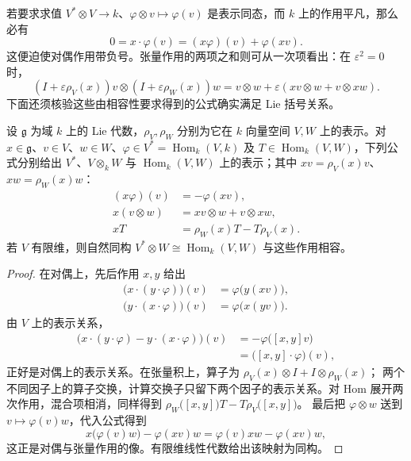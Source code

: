 若要求求值 \(V^*\otimes V\to k\)、\(\varphi\otimes v\mapsto\varphi(v)\) 是表示同态，而 \(k\) 上的作用平凡，那么必有
\[
	0=x\cdot\varphi(v)=(x\varphi)(v)+\varphi(xv).
\]
这便迫使对偶作用带负号。张量作用的两项之和则可从一次项看出：在 \(\varepsilon^2=0\) 时，
\[
	(I+\varepsilon\rho_V(x))v\otimes(I+\varepsilon\rho_W(x))w =v\otimes w+\varepsilon(xv\otimes w+v\otimes xw).
\]
下面还须核验这些由相容性要求得到的公式确实满足 Lie 括号关系。

\begin{proposition}\label{b5:prop:lie-dual-tensor-hom}
	设 \(\mathfrak g\) 为域 \(k\) 上的 Lie 代数，\(\rho_V,\rho_W\) 分别为它在 \(k\) 向量空间 \(V,W\) 上的表示。对 \(x\in\mathfrak g\)、\(v\in V\)、\(w\in W\)、\(\varphi\in V^*=\operatorname{Hom}_k(V,k)\) 及 \(T\in\operatorname{Hom}_k(V,W)\)，下列公式分别给出 \(V^*\)、\(V\otimes_k W\) 与 \(\operatorname{Hom}_k(V,W)\) 上的表示；其中 \(xv=\rho_V(x)v\)、\(xw=\rho_W(x)w\)：
	\[
		\begin{aligned}
			(x\varphi)(v)&=-\varphi(xv),\\
			x(v\otimes w)&=xv\otimes w+v\otimes xw,\\
			xT&=\rho_W(x)T-T\rho_V(x).
		\end{aligned}
	\]
	若 \(V\) 有限维，则自然同构 \(V^*\otimes W\cong\operatorname{Hom}_k(V,W)\) 与这些作用相容。
\end{proposition}
\begin{proof}
	在对偶上，先后作用 \(x,y\) 给出
	\[
		\begin{aligned}
			\bigl(x\cdot(y\cdot\varphi)\bigr)(v)&=\varphi\bigl(y(xv)\bigr),\\
			\bigl(y\cdot(x\cdot\varphi)\bigr)(v)&=\varphi\bigl(x(yv)\bigr).
		\end{aligned}
	\]
	由 \(V\) 上的表示关系，
	\[
		\begin{aligned}
			\bigl(x\cdot(y\cdot\varphi)-y\cdot(x\cdot\varphi)\bigr)(v) &=-\varphi\bigl([x,y]v\bigr)\\
			&=\bigl([x,y]\cdot\varphi\bigr)(v),
		\end{aligned}
	\]
	正好是对偶上的表示关系。在张量积上，算子为 \(\rho_V(x)\otimes I+I\otimes\rho_W(x)\)； 两个不同因子上的算子交换，计算交换子只留下两个因子的表示关系。对 Hom 展开两次作用，混合项相消，同样得到 \(\rho_W\bigl([x,y]\bigr)T-T\rho_V\bigl([x,y]\bigr)\)。 最后把 \(\varphi\otimes w\) 送到 \(v\mapsto\varphi(v)w\)，代入公式得到
	\[
		x\bigl(\varphi(v)w\bigr)-\varphi(xv)w =\varphi(v)xw-\varphi(xv)w,
	\]
	这正是对偶与张量作用的像。有限维线性代数给出该映射为同构。
\end{proof}
